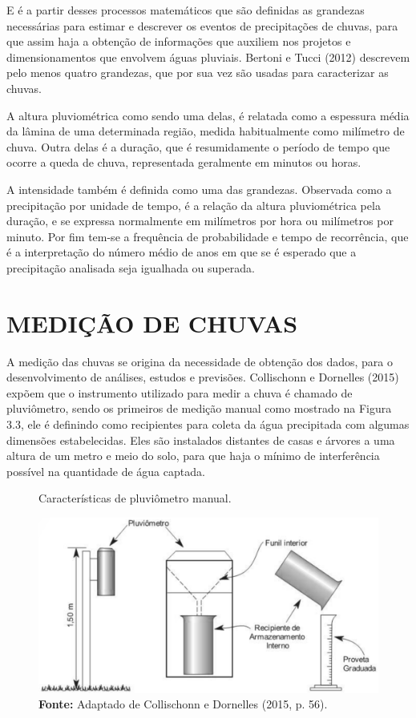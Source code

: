 E é a partir desses processos matemáticos que são definidas as grandezas necessárias para estimar e descrever os eventos de precipitações de chuvas, para que assim haja a obtenção de informações que auxiliem nos projetos e dimensionamentos que envolvem águas pluviais. Bertoni e Tucci (2012) descrevem pelo menos quatro grandezas, que por sua vez são usadas para caracterizar as chuvas. 

A altura pluviométrica como sendo uma delas, é relatada como a espessura média da lâmina de uma determinada região, medida habitualmente como milímetro de chuva. Outra delas é a duração, que é resumidamente o período de tempo que ocorre a queda de chuva, representada geralmente em minutos ou horas. 

A intensidade também é definida como uma das grandezas. Observada como a precipitação por unidade de tempo, é a relação da altura pluviométrica pela duração, e se expressa normalmente em milímetros por hora ou milímetros por minuto. Por fim tem-se a frequência de probabilidade e tempo de recorrência, que é a interpretação do número médio de anos em que se é esperado que a precipitação analisada seja igualhada ou superada.

\section{MEDIÇÃO DE CHUVAS}

A medição das chuvas se origina da necessidade de obtenção dos dados, para o desenvolvimento de análises, estudos e previsões. Collischonn e Dornelles (2015) expõem que o instrumento utilizado para medir a chuva é chamado de pluviômetro, sendo os primeiros de medição manual como mostrado na Figura 3.3, ele é definindo como recipientes para coleta da água precipitada com algumas dimensões estabelecidas. Eles são instalados distantes de casas e árvores a uma altura de um metro e meio do solo, para que haja o mínimo de interferência possível na quantidade de água captada.\bigskip

\begin{figure}[!ht]
	\centering
	\caption{Características de pluviômetro manual.}
	\includegraphics[width=.7625\linewidth]{figuras/caracteristicas_de_um_pluviometro_de_leitura_manual.png}
	\caption*{\textbf{Fonte:} Adaptado de Collischonn e Dornelles (2015, p. 56).}
	\label{fig:caracteristicas_de_um_pluviometro_de_leitura_manual.png}
\end{figure}

